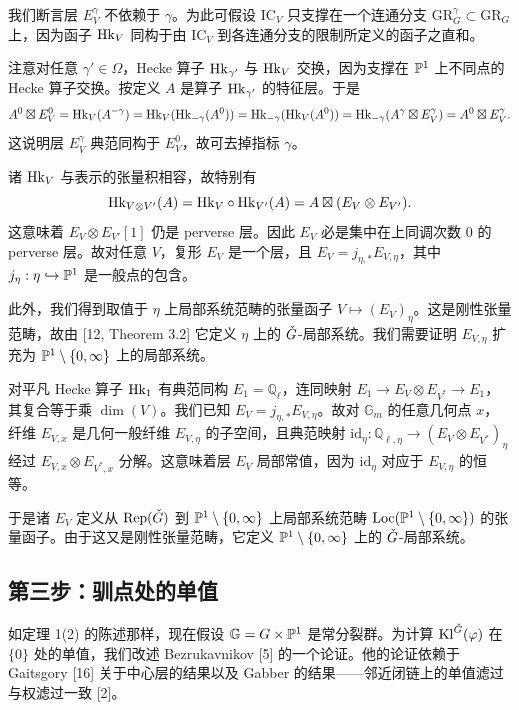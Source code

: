 我们断言层 $E^\gamma_V$ 不依赖于 $\gamma$。为此可假设 $\mathrm{IC}_V$ 只支撑在一个连通分支 $\mathrm{GR}^\gamma_G\subset\mathrm{GR}_G$ 上，因为函子 $\mathrm{Hk}_V$ 同构于由 $\mathrm{IC}_V$ 到各连通分支的限制所定义的函子之直和。

注意对任意 $\gamma'\in\Omega$，Hecke 算子 $\mathrm{Hk}_{\gamma'}$ 与 $\mathrm{Hk}_V$ 交换，因为支撑在 $\mathbb{P}^1$ 上不同点的 Hecke 算子交换。按定义 $A$ 是算子 $\mathrm{Hk}_{\gamma'}$ 的特征层。于是
\[
A^0\boxtimes E^0_V=\mathrm{Hk}_V(A^{-\gamma})=\mathrm{Hk}_V(\mathrm{Hk}_{-\gamma}(A^0))
=\mathrm{Hk}_{-\gamma}(\mathrm{Hk}_V(A^0))=\mathrm{Hk}_{-\gamma}(A^\gamma\boxtimes E^\gamma_V)
=A^0\boxtimes E^\gamma_V.
\]
这说明层 $E^\gamma_V$ 典范同构于 $E^0_V$，故可去掉指标 $\gamma$。

诸 $\mathrm{Hk}_V$ 与表示的张量积相容，故特别有
\[
\mathrm{Hk}_{V\otimes V'}(A)=\mathrm{Hk}_V\circ\mathrm{Hk}_{V'}(A)=A\boxtimes(E_V\otimes E_{V'}).
\]
这意味着 $E_V\otimes E_{V'}[1]$ 仍是 perverse 层。因此 $E_V$ 必是集中在上同调次数 $0$ 的 perverse 层。故对任意 $V$，复形 $E_V$ 是一个层，且 $E_V=j_{\eta,*}E_{V,\eta}$，其中 $j_\eta:\eta\hookrightarrow\mathbb{P}^1$ 是一般点的包含。

此外，我们得到取值于 $\eta$ 上局部系统范畴的张量函子 $V\mapsto(E_V)_\eta$。这是刚性张量范畴，故由 [12, Theorem 3.2] 它定义 $\eta$ 上的 $\check G$-局部系统。我们需要证明 $E_{V,\eta}$ 扩充为 $\mathbb{P}^1\setminus\{0,\infty\}$ 上的局部系统。

对平凡 Hecke 算子 $\mathrm{Hk}_1$ 有典范同构 $E_1=\mathbb{Q}_\ell$，连同映射 $E_1\to E_V\otimes E_{V^*}\to E_1$，其复合等于乘 $\dim(V)$。我们已知 $E_V=j_{\eta,*}E_{V,\eta}$。故对 $\mathbb{G}_m$ 的任意几何点 $x$，纤维 $E_{V,x}$ 是几何一般纤维 $E_{V,\eta}$ 的子空间，且典范映射 $\mathrm{id}_\eta:\mathbb{Q}_{\ell,\eta}\to(E_V\otimes E_{V^*})_\eta$ 经过 $E_{V,x}\otimes E_{V^*,x}$ 分解。这意味着层 $E_V$ 局部常值，因为 $\mathrm{id}_\eta$ 对应于 $E_{V,\eta}$ 的恒等。

于是诸 $E_V$ 定义从 $\mathrm{Rep}(\check G)$ 到 $\mathbb{P}^1\setminus\{0,\infty\}$ 上局部系统范畴 $\mathrm{Loc}(\mathbb{P}^1\setminus\{0,\infty\})$ 的张量函子。由于这又是刚性张量范畴，它定义 $\mathbb{P}^1\setminus\{0,\infty\}$ 上的 $\check G$-局部系统。

\subsection{第三步：驯点处的单值}

如定理 1(2) 的陈述那样，现在假设 $\mathbb{G}=G\times\mathbb{P}^1$ 是常分裂群。为计算 $\mathrm{Kl}^{\check G}(\varphi)$ 在 $\{0\}$ 处的单值，我们改述 Bezrukavnikov [5] 的一个论证。他的论证依赖于 Gaitsgory [16] 关于中心层的结果以及 Gabber 的结果——邻近闭链上的单值滤过与权滤过一致 [2]。

